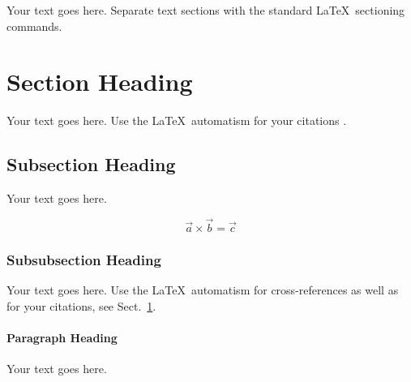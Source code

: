 Your text goes here. Separate text sections with the standard \LaTeX\
sectioning commands.

\section{Section Heading}
\label{sec:1}
Your text goes here. Use the \LaTeX\ automatism for your citations
\cite{monograph}.

\subsection{Subsection Heading}
\label{sec:2}
Your text goes here.

\begin{equation}
\vec{a}\times\vec{b}=\vec{c}
\end{equation}

\subsubsection{Subsubsection Heading}
Your text goes here. Use the \LaTeX\ automatism for cross-references as
well as for your citations, see Sect.~\ref{sec:1}.

\paragraph{Paragraph Heading} %
Your text goes here.


